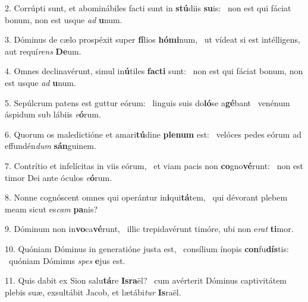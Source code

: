 2. Corrúpti sunt, et abominábiles facti sunt in \textbf{stú}diis \textbf{su}is: \ast\  non est qui fáciat bonum, non est usque \textit{ad} \textbf{u}num.\

3. Dóminus de cælo prospéxit super \textbf{fí}lios \textbf{hó}\textbf{mi}num, \ast\  ut vídeat si est intélligens, aut requí\textit{rens} \textbf{De}um.\

4. Omnes declinavérunt, simul in\textbf{ú}tiles \textbf{fac}\textbf{ti} sunt: \ast\  non est qui fáciat bonum, non est usque \textit{ad} \textbf{u}num.\

5. Sepúlcrum patens est guttur eórum: \dag\  linguis suis do\textbf{ló}se a\textbf{gé}bant \ast\  venénum áspidum sub lábiis \textit{e}\textbf{ó}rum.\

6. Quorum os maledictióne et amari\textbf{tú}dine \textbf{ple}\textbf{num} est: \ast\  velóces pedes eórum ad effundén\textit{dum} \textbf{sán}guinem.\

7. Contrítio et infelícitas in viis eórum, \dag\  et viam pacis non \textbf{co}gno\textbf{vé}runt: \ast\  non est timor Dei ante óculos \textit{e}\textbf{ó}rum.\

8. Nonne cognóscent omnes qui operántur in\textbf{i}qui\textbf{tá}tem, \ast\  qui dévorant plebem meam sicut es\textit{cam} \textbf{pa}nis?\

9. Dóminum non in\textbf{vo}ca\textbf{vé}runt, \ast\  illic trepidavérunt timóre, ubi non e\textit{rat} \textbf{ti}mor.\

10. Quóniam Dóminus in generatióne justa est, \dag\  consílium ínopis \textbf{con}fu\textbf{dís}tis: \ast\  quóniam Dóminus \textit{spes} \textbf{e}jus est.\

11. Quis dabit ex Sion salu\textbf{tá}re \textbf{Is}\textbf{ra}ël? \ast\  cum avérterit Dóminus captivitátem plebis suæ, exsultábit Jacob, et lætábi\textit{tur} \textbf{Is}raël.\

